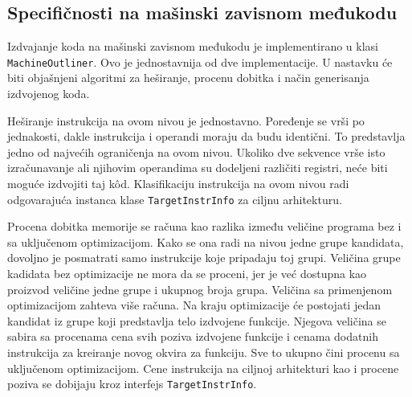 \documentclass[12pt,oneside]{memoir}
\begin{document}
\subsection{Specifičnosti na mašinski zavisnom međukodu}


Izdvajanje koda na mašinski zavisnom međukodu je implementirano u klasi \verb|MachineOutliner|.
Ovo je jednostavnija od dve implementacije.
U nastavku će biti objašnjeni algoritmi za heširanje, procenu dobitka i način generisanja izdvojenog koda.

Heširanje instrukcija na ovom nivou je jednostavno.
Poređenje se vrši po jednakosti, dakle instrukcija i operandi moraju da budu identični.
To predstavlja jedno od najvećih ograničenja na ovom nivou.
Ukoliko dve sekvence vrše isto izračunavanje ali njihovim operandima su dodeljeni različiti registri, neće biti moguće izdvojiti taj k\^od.
Klasifikaciju instrukcija na ovom nivou radi odgovarajuća instanca klase \verb|TargetInstrInfo| za ciljnu arhitekturu.

Procena dobitka memorije se računa kao razlika između veličine programa bez i sa uključenom optimizacijom.
Kako se ona radi na nivou jedne grupe kandidata, dovoljno je posmatrati samo instrukcije koje pripadaju toj grupi. %
Veličina grupe kadidata bez optimizacije ne mora da se proceni, jer je već dostupna kao proizvod veličine jedne grupe i ukupnog broja grupa.
Veličina sa primenjenom optimizacijom zahteva više računa.
Na kraju optimizacije će postojati jedan kandidat iz grupe koji predstavlja telo izdvojene funkcije.
Njegova veličina se sabira sa procenama cena svih poziva izdvojene funkcije i cenama dodatnih instrukcija za kreiranje novog okvira za funkciju.
Sve to ukupno čini procenu sa uključenom optimizacijom.
Cene instrukcija na ciljnoj arhitekturi kao i procene poziva se dobijaju kroz interfejs \verb|TargetInstrInfo|.
\end{document}

